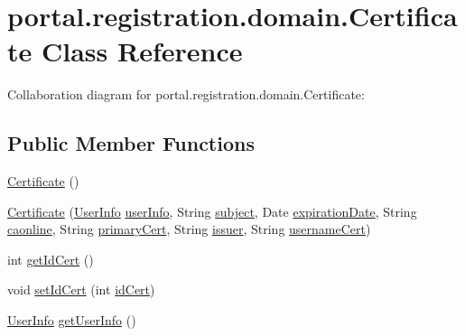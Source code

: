 \hypertarget{classportal_1_1registration_1_1domain_1_1Certificate}{
\section{portal.registration.domain.Certificate Class Reference}
\label{classportal_1_1registration_1_1domain_1_1Certificate}
}


Collaboration diagram for portal.registration.domain.Certificate:
\subsection*{Public Member Functions}
\begin{DoxyCompactItemize}
\item 
\hyperlink{classportal_1_1registration_1_1domain_1_1Certificate_aeb6b7ca93801f3769301ae53af1ea164}{Certificate} ()
\item 
\hyperlink{classportal_1_1registration_1_1domain_1_1Certificate_a905bb73644c06de9da6d440b88c89cdb}{Certificate} (\hyperlink{classportal_1_1registration_1_1domain_1_1UserInfo}{UserInfo} \hyperlink{classportal_1_1registration_1_1domain_1_1Certificate_a17f801286e01e02c092b9a92b3220b13}{userInfo}, String \hyperlink{classportal_1_1registration_1_1domain_1_1Certificate_aa5e1b492240c17ca0b863da96627855f}{subject}, Date \hyperlink{classportal_1_1registration_1_1domain_1_1Certificate_a059decff874c0a7667aee9122d9e7815}{expirationDate}, String \hyperlink{classportal_1_1registration_1_1domain_1_1Certificate_ad1d84a6be3973282fb57b0aee10a61e2}{caonline}, String \hyperlink{classportal_1_1registration_1_1domain_1_1Certificate_a3a4632cbb077929d70538d0d4a07e1bd}{primaryCert}, String \hyperlink{classportal_1_1registration_1_1domain_1_1Certificate_a3d2cd307e97c90342894a007fb235d0c}{issuer}, String \hyperlink{classportal_1_1registration_1_1domain_1_1Certificate_a27dd5145ea35c206c000e87485841d50}{usernameCert})
\item 
int \hyperlink{classportal_1_1registration_1_1domain_1_1Certificate_ab8b18d7c1b63efd645a8b505d62339f6}{getIdCert} ()
\item 
void \hyperlink{classportal_1_1registration_1_1domain_1_1Certificate_ae9ef0dd089f716d4cb52890c629ebd79}{setIdCert} (int \hyperlink{classportal_1_1registration_1_1domain_1_1Certificate_a0861b0203d5d1924de38adf80ecde323}{idCert})
\item 
\hyperlink{classportal_1_1registration_1_1domain_1_1UserInfo}{UserInfo} \hyperlink{classportal_1_1registration_1_1domain_1_1Certificate_a363b5e2296e1a83e916fac2cbe39cf42}{getUserInfo} ()

\end{DoxyCompactItemize}
